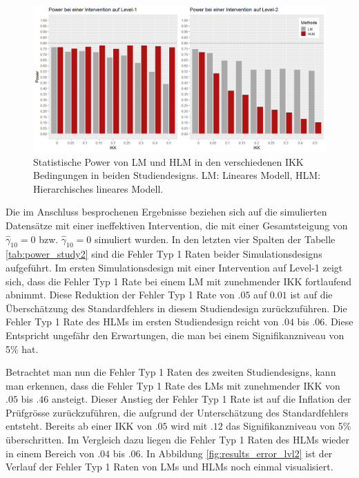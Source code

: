 \documentclass[12pt, a4paper]{article}\usepackage[]{graphicx}\usepackage[]{color}
\begin{document}
\begin{figure}[t!]
\centering
\captionsetup{width=\textwidth}
\includegraphics[width = \textwidth]{./figures/results_power}
\caption{Statistische Power von LM und HLM in den verschiedenen IKK Bedingungen in beiden Studiendesigns. LM: Lineares Modell, HLM: Hierarchisches lineares Modell.}
\label{fig:results_power}
\end{figure}

Die im Anschluss besprochenen Ergebnisse beziehen sich auf die simulierten Datensätze mit einer ineffektiven Intervention, die mit einer Gesamtsteigung von $\widehat{\gamma}_{10} = 0$ bzw. $\widehat{\gamma}_{10} = 0$ simuliert wurden. In den letzten vier Spalten der Tabelle \ref{tab:power_study2} sind die Fehler Typ 1 Raten beider Simulationsdesigns aufgeführt. Im ersten Simulationsdesign mit einer Intervention auf Level-1 zeigt sich, dass die Fehler Typ 1 Rate bei einem LM mit zunehmender IKK fortlaufend abnimmt. Diese Reduktion der Fehler Typ 1 Rate von $.05$ auf $0.01$ ist auf die Überschätzung des Standardfehlers in diesem Studiendesign zurückzuführen. Die Fehler Typ 1 Rate des HLMs im ersten Studiendesign reicht von $.04$ bis $.06$. Diese Entspricht ungefähr den Erwartungen, die man bei einem Signifikanzniveau von 5\% hat.

Betrachtet man nun die Fehler Typ 1 Raten des zweiten Studiendesigns, kann man erkennen, dass die Fehler Typ 1 Rate des LMs mit zunehmender IKK von $.05$ bis $.46$ ansteigt. Dieser Anstieg der Fehler Typ 1 Rate ist auf die Inflation der Prüfgrösse zurückzuführen, die aufgrund der Unterschätzung des Standardfehlers entsteht. Bereits ab einer IKK von $.05$ wird mit $.12$ das Signifikanzniveau von 5\% überschritten. Im Vergleich dazu liegen die Fehler Typ 1 Raten des HLMs wieder in einem Bereich von $.04$ bis $.06$. In Abbildung \ref{fig:results_error_lvl2} ist der Verlauf der Fehler Typ 1 Raten von LMs und HLMs noch einmal visualisiert. 
\end{document}
